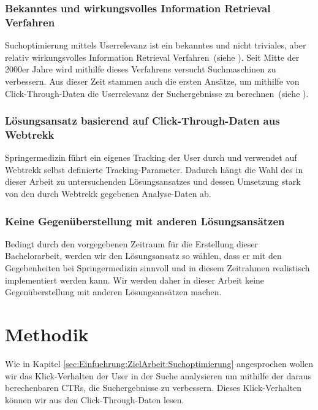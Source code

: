 \subsubsection{Bekanntes und wirkungsvolles Information Retrieval Verfahren}
\label{sec:Einfuehrung:ZielArbeit:AbbildungSpringermedizinUmfeld:InformationRetrievalVerfahren}

Suchoptimierung mittels Userrelevanz ist ein bekanntes und nicht triviales, aber relativ wirkungsvolles Information Retrieval Verfahren~(siehe \cite{IWUSBI}). Seit Mitte der 2000er Jahre wird mithilfe dieses Verfahrens versucht Suchmaschinen zu verbessern. Aus dieser Zeit stammen auch die ersten Ansätze, um mithilfe von Click-Through-Daten die Userrelevanz der Suchergebnisse zu berechnen~(siehe \cite{Joachims}).

\subsubsection{Lösungsansatz basierend auf Click-Through-Daten aus Webtrekk}
\label{sec:Einfuehrung:ZielArbeit:AbbildungSpringermedizinUmfeld:Loesungsansatz}

Springermedizin führt ein eigenes Tracking der User durch und verwendet auf Webtrekk selbst definierte Tracking-Parameter. Dadurch hängt die Wahl des in dieser Arbeit zu untersuchenden Lösungsansatzes und dessen Umsetzung stark von den durch Webtrekk gegebenen Analyse-Daten ab.

\subsubsection{Keine Gegenüberstellung mit anderen Lösungsansätzen}
\label{sec:Einfuehrung:ZielArbeit:AbbildungSpringermedizinUmfeld:NichtBehandeln}

Bedingt durch den vorgegebenen Zeitraum für die Erstellung dieser Bachelorarbeit, werden wir den Lösungsansatz so wählen, dass er mit den Gegebenheiten bei Springermedizin sinnvoll und in diesem Zeitrahmen realistisch implementiert werden kann. Wir werden daher in dieser Arbeit keine Gegenüberstellung mit anderen Lösungsansätzen machen. 


\section{Methodik}
\label{sec:Einfuehrung:Methodik}

Wie in Kapitel \ref{sec:Einfuehrung:ZielArbeit:Suchoptimierung} angesprochen wollen wir das Klick-Verhalten der User in der Suche analysieren um mithilfe der daraus berechenbaren CTRs, die Suchergebnisse zu verbessern. Dieses Klick-Verhalten können wir aus den Click-Through-Daten lesen. 

